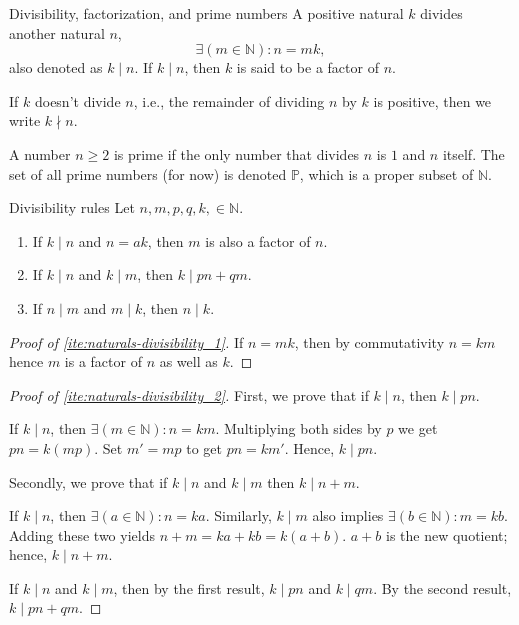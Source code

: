 \begin{df}{Divisibility, factorization, and prime numbers}{}
  A positive natural \(k\) divides another natural \(n\), \ifft
  \begin{equation}
    \exists (m \in \mathbb{N}) : n = m k,
  \end{equation}
  also denoted as \(k \mid n\). If \(k \mid n\), then \(k\) is said to be a factor of \(n\).

  If \(k\) doesn't divide \(n\), i.e., the remainder of dividing \(n\) by \(k\) is positive, then we
  write \(k \nmid n\).

  A number \(n \geq 2\) is prime if the only number that divides \(n\) is \(1\) and \(n\) itself.
  The set of all prime numbers (for now) is denoted \(\mathbb{P}\), which is a proper subset of
  \(\mathbb{N}\).
\end{df}

\begin{lemma}{Divisibility rules}{}
  Let \(n, m, p, q, k, \in \mathbb{N}\).
  \begin{enumerate}
    \item If \(k \mid n\) and \(n = a k\), then \(m\) is also a factor of \(n\).
          \label{ite:naturals-divisibility_1}
    \item If \(k \mid n\) and \(k \mid m\), then \(k \mid pn + qm\).
          \label{ite:naturals-divisibility_2}
    \item If \(n \mid m\) and \(m \mid k\), then \(n \mid k\). \label{ite:naturals-divisibility_3}
  \end{enumerate}
\end{lemma}

\begin{proof}[Proof of \cref{ite:naturals-divisibility_1}]
  If \(n = m k\), then by commutativity \(n = k m\) hence \(m\) is a factor of \(n\) as well as
  \(k\).
\end{proof}

\begin{proof}[Proof of \cref{ite:naturals-divisibility_2}]
  First, we prove that if \(k \mid n\), then \(k \mid pn\).

  If \(k \mid n\), then \(\exists (m \in \mathbb{N}) : n = k m\). Multiplying both sides by \(p\) we
  get \(pn = k (mp)\). Set \(m' = mp\) to get \(pn = k m'\). Hence, \(k \mid pn\).

  Secondly, we prove that if \(k \mid n\) and \(k \mid m\) then \(k \mid n + m\).

  If \(k \mid n\), then \(\exists (a \in \mathbb{N}) : n = k a\). Similarly, \(k \mid m\) also
  implies \(\exists (b \in \mathbb{N}) : m = k b\). Adding these two yields
  \(n + m = k a + k b = k (a + b)\). \(a + b\) is the new quotient; hence, \(k \mid n + m\).

  If \(k \mid n\) and \(k \mid m\), then by the first result, \(k \mid pn\) and \(k \mid qm\). By
  the second result, \(k \mid pn + qm\).
\end{proof}


